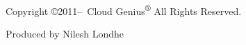 %
%

\vspace*{\fill}
\setlength{\parindent}{0pt}

\ifx\mycopyright\undefined
\else
	\textcopyright{} \mycopyright
\fi

\begin{minipage}[b]{0.9\textwidth}
\footnotesize\raggedright
\setlength{\parskip}{0.5\baselineskip}
Copyright \copyright 2011--\the\year\ Cloud Genius\textsuperscript{®} All Rights Reserved.
\par
Produced by Nilesh Londhe
\end{minipage}

\setlength{\parindent}{1em}
\clearpage
